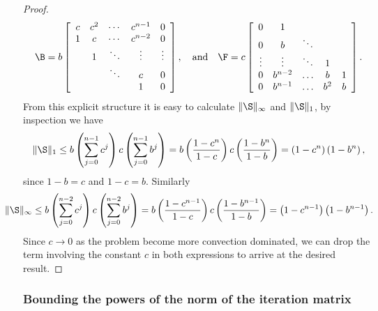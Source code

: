 \begin{proof}
\begin{equation}\label{eq:1D:FandB}
\B =
b
\left[
\begin{array}{ccccc}
 c   & c^2     & \cdots  & c^{n-1}  & 0\\
 1   & c       & \cdots  & c^{n-2}  & 0\\
     & 1       & \ddots  & \vdots   & \vdots\\
     &         & \ddots  & c        & 0\\
     &         &         & 1        & 0\\
\end{array}
\right], \quad \text{and} \quad
 \F=
c
\left[
\begin{array}{ccccc}
0      & 1       &         &         & \\
0      & b       & \ddots  &         & \\
\vdots & \vdots  & \ddots  &   1     & \\
0      & b^{n-2} & \hdots  &   b     & 1\\
0      & b^{n-1} & \hdots  &   b^2   & b\\
\end{array}
\right].
\end{equation}
From this explicit structure it is easy to calculate $\|\S\|_{\infty}$ and
$\|\S\|_{1}$, by inspection we have
\[
\|\S\|_1\leq
b\left(\sum_{j=0}^{n-1}c^j\right)c\left(\sum_{j=0}^{n-1}b^j\right)=b\left(\frac
{1-c^n}{1-c}\right)c\left(\frac{1-b^n}{1-b}\right)=\left(1-c^n\right)\left(1-b
^n\right),
\]
since $1-b=c$ and $1-c=b$.
Similarly
\[
\hspace{-2em}\|\S\|_{\infty}\leq
b\left(\sum_{j=0}^{n-2}c^j\right)c\left(\sum_{j=0}^{n-2}b^j\right)=b\left(\frac
{1-c^{n-1}}{1-c}\right)c\left(\frac{1-b^{n-1}}{1-b}\right)=\left(1-c^{n-1
}\right)\left(1-b^{n-1}\right).
\]
Since $c\rightarrow0$ as the problem become more convection dominated, we can
drop the term involving the constant $c$ in both expressions to arrive at the
desired result.
\end{proof}

\subsubsection{Bounding the powers of the norm of the iteration matrix}

